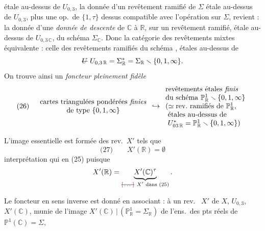 \documentclass[11pt,a4paper]{article}
\begin{document}
étale au-dessus de \add{$\Sigma^* =$} $U_{0,3}$, 
 la donnée d'un revêtement ramifié de $\Sigma$ étale au-dessus de
$U_{0,3}$, plus une op.\ de $\{1, \tau\}$ dessus compatible avec l'opération
sur $\Sigma$, revient : la donnée d'une \emph{donnée de descente} de
$\mathbb{C}$ à $\mathbb{R}$, sur un revêtement ramifié, étale au-dessus de
$U_{0,3\,\mathbb{C}}$, du schéma $\Sigma_{\mathbb{C}}$. Donc
la catégorie des revêtements mixtes  équivalente : celle des
revêtements ramifiés du schéma 
, étales au-dessus de
\[
  \text{\struck{$U$}} \ U_{0,3\,\mathbb{R}} = \Sigma^*_{\mathbb{R}}
  = \Sigma_{\mathbb{R}} \smallsetminus \{0, 1, \infty\} .
\]
On trouve ainsi un \emph{foncteur pleinement fidèle}
\[
  \text{(26)} \quad
  \begin{array}{c}
    \text{cartes triangulées pondérées \textit{finies}} \\
    \text{de type } \{0, 1, \infty\}
  \end{array}
  \hookrightarrow
  \begin{array}{l}
    \text{revêtements étales \textit{finis}} \\
    \text{du schéma } \mathbb{P}^1_{\mathbb{R}} \smallsetminus \{0,1,\infty\} \\
    (\simeq \text{rev.\ ramifiés de } \mathbb{P}^1_{\mathbb{R}}, \\
    \ \text{étales au-dessus de} \\
    \ U^*_{03\,\mathbb{R}} = \mathbb{P}^1_{\mathbb{R}} \smallsetminus \{0,1,\infty\})
  \end{array}
\]

L'image essentielle est formée des rev.\ $X'$ tels que \struck{\ill{}}
\[
  \text{(27)} \qquad X'(\mathbb{R}) = \emptyset
\]
interprétation qui en   (25) puisque
\[
  X'(\mathbb{R}) = \underbrace{X'(\mathbb{C})^\tau}_{\text{\struck{\ill{}} $X'$ dans (25)}} .
\]

Le foncteur en sens inverse est donné en associant : à un rev.\
 $X'$ de $X$,  $U_{0,3}$, 
$X'(\mathbb{C})$, munie de l'image \uncertain{inverse}
$X'(\mathbb{C}) \,|\, (\mathbb{P}^1_{\mathbb{R}} = \Sigma_{\mathbb{R}})$ de
l'ens.\ des pts réels de $\mathbb{P}^1(\mathbb{C}) = \Sigma$,
\end{document}
